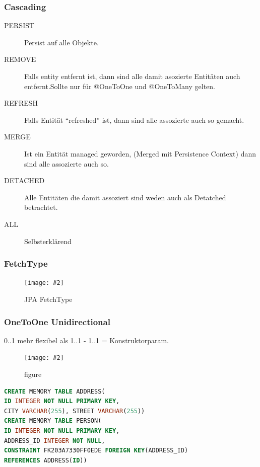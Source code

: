 \documentclass[a4paper,10pt]{scrreprt}
\newcommand{\pic}[2][figure]{\begin{figure}[h]
 \centering
 \texttt{[image: \#2]}
 \caption{#1}
\end{figure}
}
\begin{document}
\subsubsection{Cascading}
\begin{description}
\item[ PERSIST] Persist auf alle Objekte.
\item[ REMOVE ] Falls entity entfernt ist, dann sind alle damit asozierte Entitäten auch entfernt.Sollte nur für @OneToOne und @OneToMany gelten.
\item[REFRESH] Falls Entität ``refreshed'' ist, dann sind alle assozierte auch so gemacht.
\item [MERGE] Ist ein Entität managed geworden, (Merged mit Persistence Context) dann sind alle assozierte auch so.
\item [DETACHED] Alle Entitäten die damit assoziert sind weden auch als Detatched betrachtet.
\item [ALL] Selbsterklärend

\end{description}


\subsubsection{FetchType}
\pic[JPA FetchType]{eaf_fetchtype.png}

\subsubsection{OneToOne Unidirectional}
0..1 mehr flexibel als 1..1 - 1..1 = Konstruktorparam.
\pic{1to1.png}

\begin{lstlisting}[language=SQL,caption=OnetoOne SQL]
 CREATE MEMORY TABLE ADDRESS(
ID INTEGER NOT NULL PRIMARY KEY,
CITY VARCHAR(255), STREET VARCHAR(255))
CREATE MEMORY TABLE PERSON(
ID INTEGER NOT NULL PRIMARY KEY,
ADDRESS_ID INTEGER NOT NULL,
CONSTRAINT FK203A7330FF0EDE FOREIGN KEY(ADDRESS_ID)
REFERENCES ADDRESS(ID))
\end{lstlisting}
\end{document}
